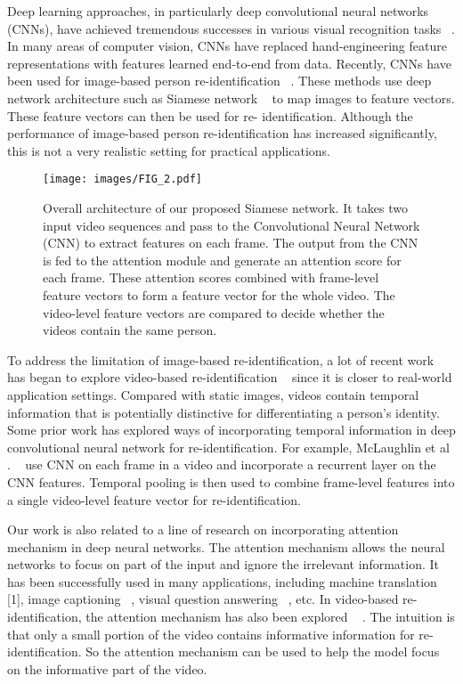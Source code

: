 \documentclass[sigconf, authordraft,review=false]{acmart}
\begin{document}
Deep  learning  approaches,  in  particularly  deep  convolutional  neural  networks  (CNNs),  have  achieved  tremendous successes in various visual recognition tasks ~\cite{krizhevsky12_nips}.  In many areas of computer vision, CNNs have replaced hand-engineering  feature  representations  with  features  learned end-to-end from data.  Recently, CNNs have been used for image-based  person  re-identification ~\cite{liao15_iccv,qian17_iccv,ustinova17_avss,varior16_eccv,xiao16_cvpr,yi14_icpr,
zhangL16_cvpr,zhengL15_iccv}.   These  methods  use  deep  network  architecture  such  as  Siamese  network  ~\cite{hadsell06_cvpr}  to  map  images  to  feature vectors.  These feature vectors can then be used for re- identification.   Although  the  performance  of  image-based person  re-identification  has  increased  significantly,  this  is not a very realistic setting for practical applications.
\begin{figure*}
\texttt{[image: images/FIG\_2.pdf]}
\caption{Overall architecture of our proposed Siamese network. It takes two input video sequences and pass to the Convolutional Neural
Network (CNN) to extract features on each frame. The output from the CNN is fed to the attention module and generate an attention score
for each frame.  These attention scores combined with frame-level feature vectors to form a feature vector for the
whole video. The video-level feature vectors are compared to decide whether the videos contain the same person.}
\end{figure*}
To address the limitation of image-based re-identification,  a  lot  of  recent  work  has  began  to  explore
video-based re-identification ~\cite{li17_workshop,liu15_iccv,mclaughlin16_cvpr,
wang14_eccv,xu17_iccv,yan16_eccv,zhou17_cvpr,zhu16_ijcai} since   it   is   closer   to   real-world   application   settings. Compared  with  static  images,   videos  contain  temporal information  that  is  potentially  distinctive  for  differentiating  a  person\textup{'}s  identity.   Some  prior  work  has  explored
ways   of   incorporating   temporal   information   in   deep convolutional  neural  network  for  re-identification. For example, McLaughlin et al . ~\cite{mclaughlin16_cvpr} use CNN on each frame in  a  video  and  incorporate  a  recurrent  layer  on  the  CNN features. Temporal  pooling  is  then  used  to  combine frame-level features into a single video-level feature vector for re-identification.

Our work is also related to a line of research on incorporating attention mechanism in deep neural networks. The
attention mechanism allows the neural networks to focus on
part of the input and ignore the irrelevant information. It has
been successfully used in many applications, including machine translation [1], image captioning ~\cite{xu15_icml}, visual question
answering ~\cite{shih16_cvpr}, etc. In video-based re-identification, the attention  mechanism  has  also  been  explored ~\cite{xu17_iccv,zhou17_cvpr} . The
intuition is that only a small portion of the video contains
informative information for re-identification.  So the attention mechanism can be used to help the model focus on the informative part of the video.
\end{document}

